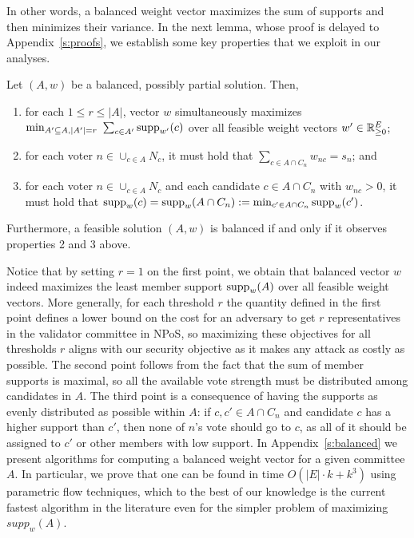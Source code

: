 In other words, a balanced weight vector maximizes the sum of supports and then minimizes their variance. 
In the next lemma, whose proof is delayed to Appendix~\ref{s:proofs}, we establish some key properties that we exploit in our analyses. 

\begin{lemma}\label{lem:balanced}
Let $(A,w)$ be a balanced, possibly partial solution. Then,
\begin{enumerate}
    \item for each $1\leq r\leq |A|$, vector $w$ simultaneously maximizes $\min_{A'\subseteq A, |A'|=r} \ \sum_{c\in A'} \operatorname{supp}_{w'}(c)$ over all feasible weight vectors $w'\in\mathbb{R}_{\geq 0}^E$; 
		\item for each voter $n\in \cup_{c\in A} N_c$, it must hold that $\sum_{c\in A\cap C_n} w_{nc}=s_n$; and
    \item for each voter $n\in \cup_{c\in A} N_c$ and each candidate $c\in A\cap C_n$ with $w_{nc} > 0$, it must hold that $\operatorname{supp}_w(c)=\operatorname{supp}_w(A\cap C_n):=\min_{c'\in A\cap C_n} \operatorname{supp}_w(c')$. 
\end{enumerate}
Furthermore, a feasible solution $(A,w)$ is balanced if and only if it observes properties 2 and 3 above.
\end{lemma}

Notice that by setting $r=1$ on the first point, we obtain that balanced vector $w$ indeed maximizes the least member support $\operatorname{supp}_w(A)$ over all feasible weight vectors. 
More generally, for each threshold $r$ the quantity defined in the first point defines a lower bound on the cost for an adversary to get $r$ representatives in the validator committee in NPoS, so maximizing these objectives for all thresholds $r$ aligns with our security objective as it makes any attack as costly as possible. 
The second point follows from the fact that the sum of member supports is maximal, so all the available vote strength must be distributed among candidates in $A$. 
The third point is a consequence of having the supports as evenly distributed as possible within $A$: if $c,c'\in A\cap C_n$ and candidate $c$ has a higher support than $c'$, then none of $n$'s vote should go to $c$, as all of it should be assigned to $c'$ or other members with low support. 
%
In Appendix~\ref{s:balanced} we present algorithms for computing a balanced weight vector for a given committee $A$. 
In particular, we prove that one can be found in time $O(|E|\cdot k + k^3)$ using parametric flow techniques, which to the best of our knowledge is the current fastest algorithm in the literature even for the simpler problem of maximizing $supp_w(A)$.

